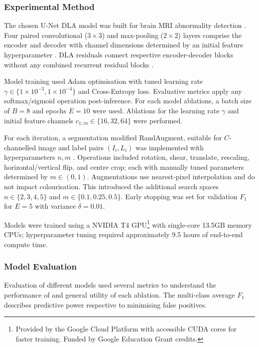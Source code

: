\subsubsection{Experimental Method}

The chosen U-Net DLA model was built for brain MRI abnormality detection \cite{ChosenModel}. Four paired convolutional ($3\times 3$) and max-pooling ($2\times 2$) layers comprise the encoder and decoder with channel dimensions determined by an initial feature hyperparameter \cite{ChosenModel}. DLA residuals connect respective encoder-decoder blocks without any combined recurrent residual blocks \cite{ChosenModel}.

Model training used Adam optimisation with tuned learning rate $\gamma \in \{1\times 10^{-3}, 1\times 10^{-4}\}$ and Cross-Entropy loss. Evaluative metrics apply any softmax/sigmoid operation post-inference. For each model ablations, a batch size of $B=8$ and epochs $E=10$ were used. Ablations for the learning rate $\gamma$ and initial feature channels $c_{1;in} \in \{16,32,64\}$ were performed.

For each iteration, a segmentation modified RandAugment, suitable for $C$-channelled image and label pairs $(I_i, L_i)$ was implemented with hyperparameters $n,m$ \cite{RandAugment}. Operations included rotation, shear, translate, rescaling, horizontal/vertical flip, and centre crop; each with manually tuned parameters determined by $m \in (0, 1)$. Augmentations use nearest-pixel interpolation and do not impact colourisation. This introduced the additional search spaces $n \in \{2,3,4,5\}$ and $m \in \{0.1, 0.25, 0.5\}$. Early stopping was set for validation $F_1$ for $E=5$ with variance $\delta = 0.01$.

Models were trained using a NVIDIA T4 GPU\footnote{Provided by the Google Cloud Platform with accessible CUDA cores for faster training. Funded by Google Education Grant credits.} with single-core 13.5GB memory CPUs; hyperparameter tuning required approximately 9.5 hours of end-to-end compute time.

\subsubsection{Model Evaluation}

Evaluation of different models used several metrics to understand the performance of and general utility of each ablation. The multi-class average $F_1$ describes predictive power respective to minimising false positives.

